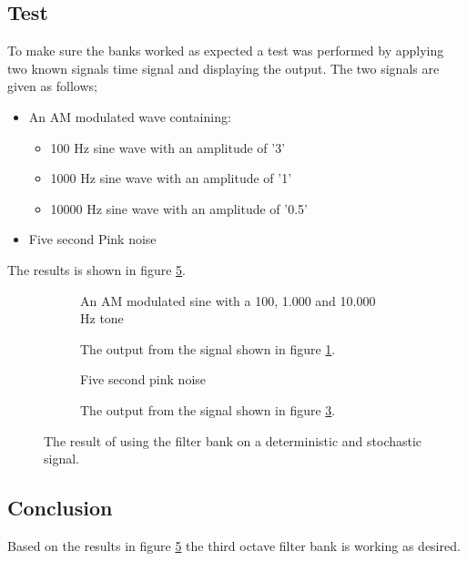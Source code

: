 \subsection{Test}

To make sure the banks worked as expected a test was performed by applying two known signals time signal and displaying the output. The two signals are given as follows;
\vspace{-6mm}
\begin{itemize}
	\item An AM modulated wave containing:
	\begin{itemize}
		\item 100 Hz sine wave with an amplitude of '3'
		\item 1000 Hz sine wave with an amplitude of '1'
		\item 10000 Hz sine wave with an amplitude of '0.5'
	\end{itemize}
	\item Five second Pink noise
\end{itemize}
\vspace{-3mm}
The results is shown in figure \ref{fig:octresults}. 
\begin{figure}[H]
	\centering
	\begin{subfigure}[b]{0.4\textwidth}
		\centering
			
		\caption{An AM modulated sine with a 100, 1.000 and 10.000 Hz tone}
		\label{fig:Signal01k1k10k}
	\end{subfigure}
	\hfill
	\begin{subfigure}[b]{0.4\textwidth}
		\centering
			
		\caption{The output from the signal shown in figure \ref{fig:Signal01k1k10k}.}
		\label{fig:OctFilter01k1k10k}
	\end{subfigure}	
	\begin{subfigure}[b]{0.4\textwidth}
		\centering
			
		\caption{Five second pink noise}
		\label{fig:PinkNoise5sec}
	\end{subfigure}	
	\hfill
	\begin{subfigure}[b]{0.4\textwidth}
		\centering
		
		\caption{The output from the signal shown in figure \ref{fig:PinkNoise5sec}.}
		\label{fig:OctFilterPink}
	\end{subfigure}	
	\caption{The result of using the filter bank on a deterministic and stochastic signal.}
	\label{fig:octresults}
\end{figure}

\subsection{Conclusion}
Based on the results in figure \ref{fig:octresults} the third octave filter bank is working as desired.
